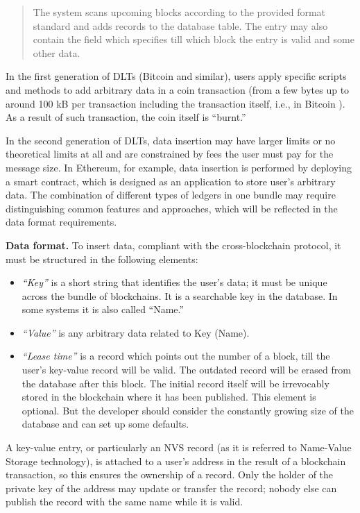 \begin{multicols}{2}
\begin{quote}
The system scans upcoming blocks according to the provided format standard and adds records to the database table. The entry may also contain the field which specifies till which block the entry is valid and some other data.
\end{quote}

In the first generation of DLTs (Bitcoin and similar), users apply specific scripts and methods to add arbitrary data in a coin transaction (from a few bytes up to around 100 kB per transaction including the transaction itself, i.e., in Bitcoin \cite{art1-key28}). As a result of such transaction, the coin itself is “burnt.”

In the second generation of DLTs, data insertion may have larger limits or no theoretical limits at all and are constrained by fees the user must pay for the message size. In Ethereum, for example, data insertion is performed by deploying a smart contract, which is designed as an application to store user’s arbitrary data. The combination of different types of ledgers in one bundle may require distinguishing common features and approaches, which will be reflected in the data format requirements.

\textbf{Data format.} To insert data, compliant with the cross-blockchain protocol, it must be structured in the following elements:
\begin{itemize}
\item \textit{“Key”} is a short string that identifies the user’s data; it must be unique across the bundle of blockchains. It is a searchable key in the database. In some systems it is also called “Name.”
\item \textit{“Value”} is any arbitrary data related to Key (Name).
\item \textit{“Lease time”} is a record which points out the number of a block, till the user’s key-value record will be valid. The outdated record will be erased from the database after this block. The initial record itself will be irrevocably stored in the blockchain where it has been published. This element is optional. But the developer should consider the constantly growing size of the database and can set up some defaults.
\end{itemize}

A key-value entry, or particularly an NVS record (as it is referred to Name-Value Storage technology), is attached to a user’s address in the result of a blockchain transaction, so this ensures the ownership of a record. Only the holder of the private key of the address may update or transfer the record; nobody else can publish the record with the same name while it is valid.


\end{multicols}
